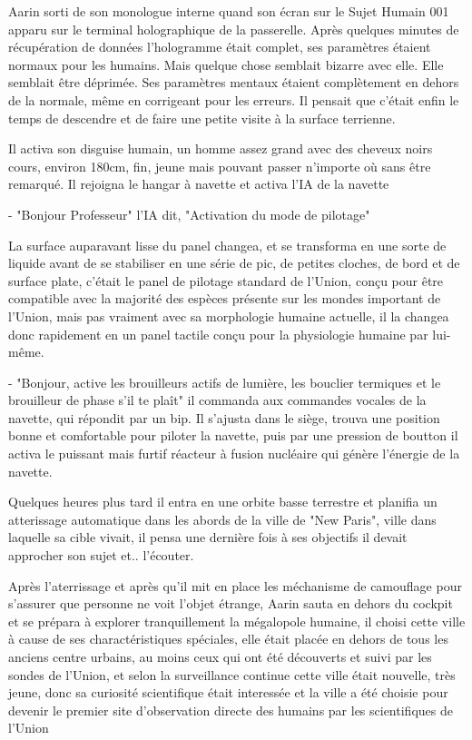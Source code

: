 \documentclass[12pt,hidelinks,a4paper]{book}
\begin{document}
Aarin sorti de son monologue interne quand son écran sur le Sujet Humain 001 apparu sur le terminal holographique de la 
passerelle. Après quelques minutes de récupération de données l'hologramme était complet, ses paramètres étaient normaux pour 
les humains. Mais quelque chose semblait bizarre avec elle. Elle semblait être déprimée. Ses paramètres mentaux étaient 
complètement en dehors de la normale, même en corrigeant pour les erreurs. Il pensait que c'était enfin le temps de descendre 
et de faire une petite visite à la surface terrienne.\par 
\bigskip 

Il activa son \gls{disguise} humain, un homme assez grand avec des cheveux noirs cours, environ 180cm, fin, 
jeune mais pouvant passer n'importe où sans être remarqué. Il rejoigna le hangar à navette et activa l'IA de la navette\par 
\bigskip

- "Bonjour Professeur" l'IA dit, "Activation du mode de pilotage"\par 
\bigskip 
La surface auparavant lisse du panel changea, et se transforma en une sorte de liquide avant de 
se stabiliser en une série de pic, de petites cloches, de bord et de surface plate, c'était le panel de pilotage 
standard de l'Union, conçu pour être compatible avec la majorité des espèces présente sur les mondes important de 
l'Union, mais pas vraiment avec sa morphologie humaine actuelle, il la changea donc rapidement en un panel tactile
conçu pour la physiologie humaine par lui-même.\par 
\bigskip

- "Bonjour, active les brouilleurs actifs de lumière, les bouclier termiques et le brouilleur de phase s'il te plaît"
il commanda aux commandes vocales de la navette, qui répondit par un bip. 
Il s'ajusta dans le siège, trouva une position bonne et comfortable pour piloter la navette, puis par une pression de boutton
il activa le puissant mais furtif réacteur à fusion nucléaire qui génère l'énergie de la navette.\par 
\bigskip

Quelques heures plus tard il entra en une orbite basse terrestre et planifia un atterissage automatique dans les 
abords de la ville de "New Paris", ville dans laquelle sa cible vivait, il pensa une dernière fois à ses objectifs
il devait approcher son sujet et.. l'écouter.\par 
\bigskip

Après l'aterrissage et après qu'il mit en place les méchanisme de camouflage pour s'assurer que personne ne voit 
l'objet étrange, Aarin sauta en dehors du cockpit et se prépara à explorer tranquillement la mégalopole humaine,
il choisi cette ville à cause de ses charactéristiques spéciales, elle était placée en dehors de tous les anciens 
centre urbains, au moins ceux qui ont été découverts et suivi par les sondes de l'Union, et selon la 
surveillance continue cette ville était nouvelle, très jeune, donc sa curiosité scientifique était interessée
et la ville a été choisie pour devenir le premier site d'observation directe des humains par les scientifiques de l'Union\par 
\bigskip
\end{document}
